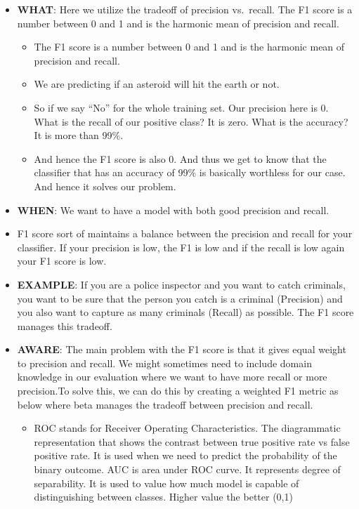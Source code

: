 \documentclass[
]{book}
\providecommand{\tightlist}{%
  \setlength{\itemsep}{0pt}\setlength{\parskip}{0pt}}
\begin{document}
\begin{itemize}
\item
  \textbf{WHAT}: Here we utilize the tradeoff of precision vs.~recall. The F1 score is a number between 0 and 1 and is the harmonic mean of precision and recall.

  \begin{itemize}
  \item
    The F1 score is a number between 0 and 1 and is the harmonic mean of precision and recall.
  \item
    We are predicting if an asteroid will hit the earth or not.
  \item
    So if we say ``No'' for the whole training set. Our precision here is 0. What is the recall of our positive class? It is zero. What is the accuracy? It is more than 99\%.
  \item
    And hence the F1 score is also 0. And thus we get to know that the classifier that has an accuracy of 99\% is basically worthless for our case. And hence it solves our problem.
  \end{itemize}
\item
  \textbf{WHEN}: We want to have a model with both good precision and recall.
\item
  F1 score sort of maintains a balance between the precision and recall for your classifier. If your precision is low, the F1 is low and if the recall is low again your F1 score is low.
\item
  \textbf{EXAMPLE}: If you are a police inspector and you want to catch criminals, you want to be sure that the person you catch is a criminal (Precision) and you also want to capture as many criminals (Recall) as possible. The F1 score manages this tradeoff.
\item
  \textbf{AWARE}: The main problem with the F1 score is that it gives equal weight to precision and recall. We might sometimes need to include domain knowledge in our evaluation where we want to have more recall or more precision.To solve this, we can do this by creating a weighted F1 metric as below where beta manages the tradeoff between precision and recall.

  \begin{itemize}
  \tightlist
  \item
    ROC stands for Receiver Operating Characteristics. The diagrammatic representation that shows the contrast between true positive rate vs false positive rate. It is used when we need to predict the probability of the binary outcome. AUC is area under ROC curve. It represents degree of separability. It is used to value how much model is capable of distinguishing between classes. Higher value the better (0,1)
  \end{itemize}
\end{itemize}
\end{document}

